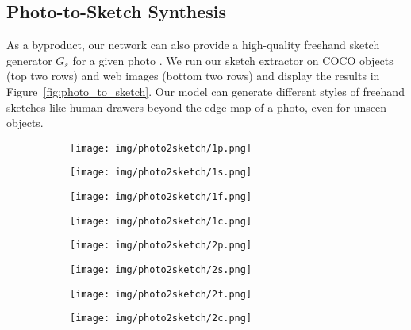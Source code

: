 \documentclass[10pt,twocolumn,letterpaper]{article}
\begin{document}
\subsection{Photo-to-Sketch Synthesis}
\label{sec:p2s_syn}
As a byproduct, our network can also provide a high-quality freehand sketch generator $G_{s}$ for a given photo \cite{pang2018deep,yi2019apdrawinggan,kampelmuhler2020synthesizing}. We run our sketch extractor on COCO objects (top two rows) and web images (bottom two rows) and display the results in Figure~\ref{fig:photo_to_sketch}. Our model can generate different styles of freehand sketches like human drawers beyond the edge map of a photo, even for unseen objects.

\newcommand{\ptswidth}{0.22} 
\begin{figure}[tbp]
\captionsetup[subfigure]{labelformat=empty}
\begin{center}
  \begin{subfigure}[b]{\ptswidth\linewidth}
  \texttt{[image: img/photo2sketch/1p.png]}
  \end{subfigure}
  \begin{subfigure}[b]{\ptswidth\linewidth}
  \texttt{[image: img/photo2sketch/1s.png]}
  \end{subfigure}
\begin{subfigure}[b]{\ptswidth\linewidth}
  \texttt{[image: img/photo2sketch/1f.png]}
  \end{subfigure}
  \begin{subfigure}[b]{\ptswidth\linewidth}
  \texttt{[image: img/photo2sketch/1c.png]}
  \end{subfigure}
  
  \begin{subfigure}[b]{\ptswidth\linewidth}
  \texttt{[image: img/photo2sketch/2p.png]}
  \end{subfigure}
  \begin{subfigure}[b]{\ptswidth\linewidth}
  \texttt{[image: img/photo2sketch/2s.png]}
  \end{subfigure}
\begin{subfigure}[b]{\ptswidth\linewidth}
  \texttt{[image: img/photo2sketch/2f.png]}
  \end{subfigure}
  \begin{subfigure}[b]{\ptswidth\linewidth}
  \texttt{[image: img/photo2sketch/2c.png]}
  \end{subfigure}
  

\end{center}
\end{figure}
\end{document}
